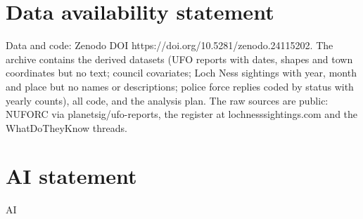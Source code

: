 \documentclass[11pt,a4paper]{article}
\begin{document}
\section*{Data availability statement}
Data and code: Zenodo DOI https://doi.org/10.5281/zenodo.24115202. The archive contains the derived datasets (UFO reports with dates, shapes and town coordinates but no text; council covariates; Loch Ness sightings with year, month and place but no names or descriptions; police force replies coded by status with yearly counts), all code, and the analysis plan. The raw sources are public: NUFORC via planetsig/ufo-reports, the register at lochnesssightings.com and the WhatDoTheyKnow threads.

\section*{AI statement}
{{AI}}
\end{document}
